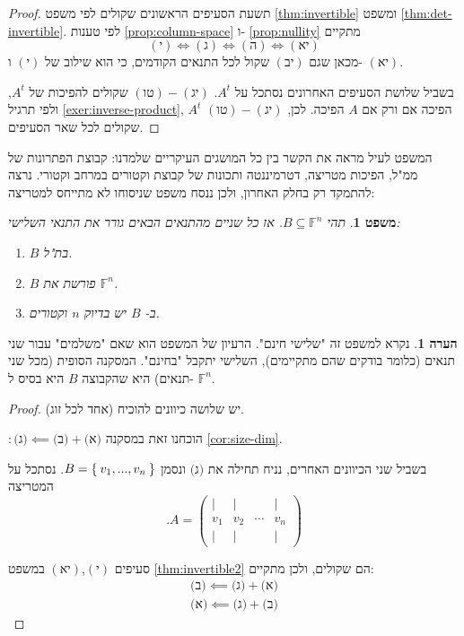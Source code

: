 \documentclass[12pt]{report}
\theoremstyle{plain}
\newtheorem{theorem}{משפט}[chapter]
\theoremstyle{definition}
\newtheorem{remark}{הערה}[chapter]
\newcommand{\F}{\mathbb{F}}
\newcommand{\0}{\mathbf{0}}
\begin{document}
\begin{proof}
תשעת הסעיפים הראשונים שקולים לפי משפט
\ref{thm:invertible}
ומשפט
\ref{thm:det-invertible}. 
לפי טענות 
\ref{prop:column-space}
ו-
\ref{prop:nullity}
מתקיים
$$
(\text{י}) \iff (\text{ג})\iff(\text{ה})\iff(\text{יא})
$$
מכאן שגם
$(\text{יב})$
שקול לכל התנאים הקודמים, כי הוא שילוב של 
$(\text{י})$
ו-
$(\text{יא})$.

בשביל שלושת הסעיפים האחרונים נסתכל על 
$A^t$.
$(\text{טו})-(\text{יג})$
שקולים להפיכות של
$A^t$,
ולפי תרגיל
\ref{exer:inverse-product},
$A^t$
הפיכה אם ורק אם
$A$
הפיכה. לכן,
$(\text{טו})-(\text{יג})$
שקולים לכל שאר הסעיפים.
\end{proof}

המשפט לעיל מראה את הקשר בין כל המושגים העיקריים שלמדנו: קבוצת הפתרונות של ממ"ל, הפיכות מטריצה, דטרמיננטה ותכונות של קבוצת וקטורים במרחב וקטורי. נרצה להתמקד רק בחלק האחרון, ולכן ננסח משפט שניסוחו לא מתייחס למטריצה:

\begin{theorem}\label{thm:3-for-2}
תהי
$B\subseteq\F^n$.
אז כל שניים מהתנאים הבאים גורר את התנאי השלישי:

\begin{enumerate}[label=(\alph*)]
\item
$B$
בת"ל.


\item
$B$
פורשת את
$\F^n$.


\item
ב-
$B$
יש בדיוק
$n$ 
וקטורים.


\end{enumerate}
\end{theorem}

\begin{remark}
נקרא למשפט זה "שלישי חינם". הרעיון של המשפט הוא שאם "משלמים" עבור שני תנאים (כלומר בודקים שהם מתקיימים), השלישי יתקבל "בחינם". המסקנה הסופית (מכל שני תנאים) היא שהקבוצה
$B$
היא בסיס ל-
$\F^n$.
\end{remark}

\begin{proof}
יש שלושה כיוונים להוכיח (אחד לכל זוג).

$:\text{(ג)}\impliedby \text{(ב)}+\text{(א)}$
הוכחנו זאת במסקנה
\ref{cor:size-dim}.

בשביל שני הכיוונים האחרים, נניח תחילה את 
$\text{(ג)}$
ונסמן
$B=\Set{v_1,...,v_n}$.
נסתכל על המטריצה
$$
.A=\begin{pmatrix}
| & | & & | \\
v_1 & v_2 & \cdots & v_n \\
| & | & & |
\end{pmatrix}
$$

סעיפים 
$(\text{י})$,$(\text{יא})$
במשפט
\ref{thm:invertible2}
הם שקולים, ולכן מתקיים:
$$
\begin{aligned}
\text{(ב)}\impliedby\text{(ג)}+\text{(א)} \\
\text{(א)}\impliedby\text{(ג)}+\text{(ב)}
\end{aligned}
$$

\end{proof}
\end{document}

